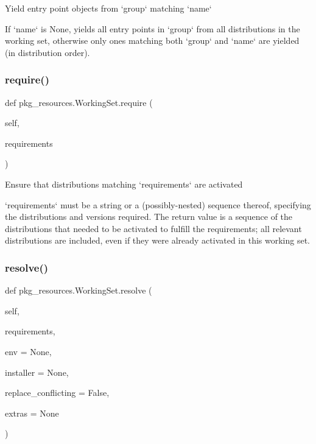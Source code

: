 \begin{DoxyVerb}Yield entry point objects from `group` matching `name`

If `name` is None, yields all entry points in `group` from all
distributions in the working set, otherwise only ones matching
both `group` and `name` are yielded (in distribution order).
\end{DoxyVerb}
 \mbox{\label{classpkg__resources_1_1WorkingSet_a1c2434f098e08c20314935fddad8426b}} 
\subsubsection{\texorpdfstring{require()}{require()}}
{\footnotesize\ttfamily def pkg\+\_\+resources.\+Working\+Set.\+require (\begin{DoxyParamCaption}\item[{}]{self,  }\item[{}]{requirements }\end{DoxyParamCaption})}

\begin{DoxyVerb}Ensure that distributions matching `requirements` are activated

`requirements` must be a string or a (possibly-nested) sequence
thereof, specifying the distributions and versions required.  The
return value is a sequence of the distributions that needed to be
activated to fulfill the requirements; all relevant distributions are
included, even if they were already activated in this working set.
\end{DoxyVerb}
 \mbox{\label{classpkg__resources_1_1WorkingSet_a38c13850cc73d319b4bcf47592132941}} 
\subsubsection{\texorpdfstring{resolve()}{resolve()}}
{\footnotesize\ttfamily def pkg\+\_\+resources.\+Working\+Set.\+resolve (\begin{DoxyParamCaption}\item[{}]{self,  }\item[{}]{requirements,  }\item[{}]{env = {\ttfamily None},  }\item[{}]{installer = {\ttfamily None},  }\item[{}]{replace\+\_\+conflicting = {\ttfamily False},  }\item[{}]{extras = {\ttfamily None} }\end{DoxyParamCaption})}

